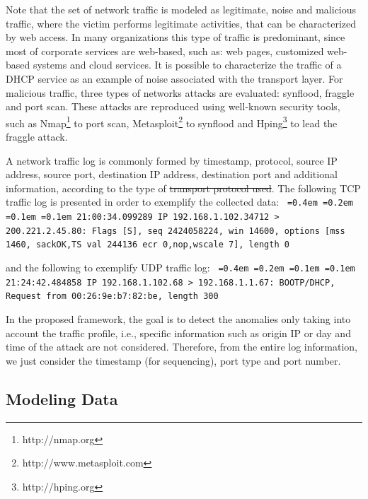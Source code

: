 \documentclass[review]{elsarticle}
\newcommand*\justify{%
	\fontdimen2\font=0.4em%
	\fontdimen3\font=0.2em%
	\fontdimen4\font=0.1em%
	\fontdimen7\font=0.1em%
}
\providecommand{\DIFaddtex}[1]{{\protect\color{blue}\uwave{#1}}} %
\providecommand{\DIFdeltex}[1]{{\protect\color{red}\sout{#1}}}                      %
\providecommand{\DIFaddbegin}{} %
\providecommand{\DIFaddend}{} %
\providecommand{\DIFdelbegin}{} %
\providecommand{\DIFdelend}{} %
\providecommand{\DIFadd}[1]{\texorpdfstring{\DIFaddtex{#1}}{#1}} %
\providecommand{\DIFdel}[1]{\texorpdfstring{\DIFdeltex{#1}}{}} %
\begin{document}
Note that the set of network traffic is modeled as legitimate, noise and malicious traffic, where the victim performs legitimate activities, that can be characterized by web access. In many organizations this type of traffic is predominant, since most of corporate services are web-based, such as: web pages, customized web-based systems and cloud services. It is possible to characterize the traffic of a DHCP service as an example of noise associated with the transport layer. For malicious traffic, three types of networks attacks are evaluated: synflood, fraggle and port scan. These attacks are reproduced using well-known security tools, such as Nmap\footnote{http://nmap.org} to port scan, Metasploit\footnote{http://www.metasploit.com} to synflood and Hping\footnote{http://hping.org} to lead the fraggle attack.

A network traffic log is commonly formed by timestamp, protocol, source IP address, source port, destination IP address, destination port and additional information, according to the type of \DIFdelbegin \DIFdel{transport protocol used}\DIFdelend \DIFaddbegin \DIFadd{the used transport protocol}\DIFaddend . The following TCP traffic log is presented in order to exemplify the collected data:
\newline
\newline
\texttt{\justify21:00:34.099289 IP 192.168.1.102.34712 > 200.221.2.45.80: Flags [S], seq 2424058224, win 14600, options [mss 1460, sackOK,TS val 244136 ecr 0,nop,wscale 7], length 0}
\newline

and the following to exemplify UDP traffic log: 
\newline
\newline
\texttt{\justify21:24:42.484858 IP 192.168.1.102.68 > 192.168.1.1.67: BOOTP/DHCP, Request from 00:26:9e:b7:82:be, length 300}
\newline 

In the proposed framework, the goal is to detect the anomalies only taking into account the traffic profile, i.e., specific information such as origin IP or day and time of the attack are not considered. Therefore, from the entire log information, we just consider the timestamp (for sequencing), port type and port number.

\subsection{Modeling Data}
\label{sec:ModelingData}
\end{document}
